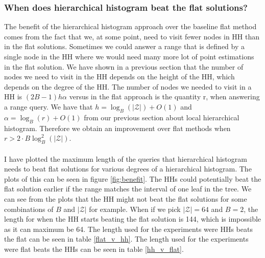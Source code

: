 \documentclass[11pt]{article}
\theoremstyle{definition}
\begin{document}
\subsubsection{When does hierarchical histogram beat the flat solutions?}
The benefit of the hierarchical histogram approach over the baseline flat method comes from the fact that we, at some point, need to visit fewer nodes in HH than in the flat solutions. Sometimes we could answer a range that is defined by a single node in the HH where we would need many more lot of point estimations in the flat solution. We have shown in a previous section that the number of nodes we need to visit in the HH depends on the height of the HH, which depends on the degree of the HH. The number of nodes we needed to visit in a HH is $(2B-1)h\alpha$ versus in the flat approach is the quantity r, when answering a range query. We have that $h=\log_B(|\mathcal{Z}|)+O(1)$ and $\alpha=\log_B(r)+O(1)$ from our previous section about local hierarchical histogram. Therefore we obtain an improvement over flat methods when $r>2\cdot B \log_B^2(|\mathcal{Z}|)$. \\ \\ I have plotted the maximum length of the queries that hierarchical histogram needs to beat flat solutions for various degrees of a hierarchical histogram. The plots of this can be seen in figure \ref{fig:benefit}. The HHs could potentially beat the flat solution earlier if the range matches the interval of one leaf in the tree. We can see from the plots that the HH might not beat the flat solutions for some combinations of $B$ and $|\mathcal{Z}|$ for example. When if we pick $|\mathcal{Z}| = 64$ and $B=2$, the length for when the HH starts beating the flat solution is 144, which is impossible as it can maximum be 64. The length used for the experiments were HHs beats the flat can be seen in table \ref{flat_v_hh}. The length used for the experiments were flat beats the HHs can be seen in table \ref{hh_v_flat}.
\end{document}
